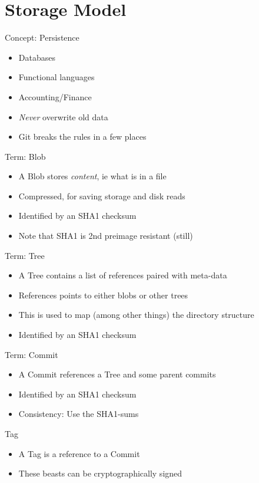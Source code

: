 \documentclass[xcolor=pdftex,dvipsnames]{beamer}
\begin{document}
\section{Storage Model}
\begin{frame}{Concept: Persistence}
  \begin{itemize}
  \item Databases
  \item Functional languages
  \item Accounting/Finance
  \item \emph{Never} overwrite old data
  \item Git breaks the rules in a few places
  \end{itemize}
\end{frame}
\begin{frame}{Term: Blob}
  \begin{itemize}
  \item A Blob stores \emph{content}, ie what is in a file
  \item Compressed, for saving storage and disk reads
  \item Identified by an SHA1 checksum
  \item Note that SHA1 is 2nd preimage resistant (still)
  \end{itemize}
\end{frame}
\begin{frame}{Term: Tree}
  \begin{itemize}
  \item A Tree contains a list of references paired with meta-data
  \item References points to either blobs or other trees
  \item This is used to map (among other things) the directory
    structure
  \item Identified by an SHA1 checksum
  \end{itemize}
\end{frame}
\begin{frame}{Term: Commit}
  \begin{itemize}
  \item A Commit references a Tree and some parent commits
  \item Identified by an SHA1 checksum
  \item Consistency: Use the SHA1-sums
  \end{itemize}
\end{frame}
\begin{frame}{Tag}
  \begin{itemize}
  \item A Tag is a reference to a Commit
  \item These beasts can be cryptographically signed
  \end{itemize}
\end{frame}
\end{document}
